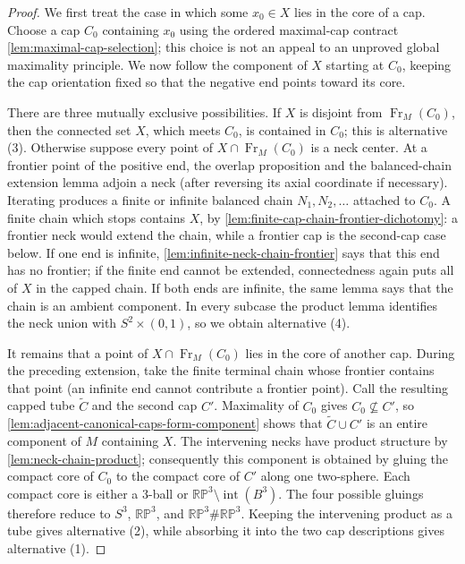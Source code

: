 \begin{proof}
We first treat the case in which some $x_0\in X$ lies in the core of a cap.
Choose a cap $C_0$ containing $x_0$ using the ordered maximal-cap contract
\ref{lem:maximal-cap-selection}; this choice is not an appeal to an
unproved global maximality principle.  We now follow the component
of $X$ starting at $C_0$, keeping the cap orientation fixed so that the
negative end points toward its core.

There are three mutually exclusive possibilities.  If $X$ is disjoint from
$\operatorname{Fr}_M(C_0)$, then the connected set $X$, which meets $C_0$,
is contained in $C_0$; this is alternative (3).  Otherwise suppose every
point of $X\cap\operatorname{Fr}_M(C_0)$ is a neck center.  At a frontier
point of the positive end, the overlap proposition and the balanced-chain
extension lemma adjoin a neck (after reversing its axial coordinate if
necessary).  Iterating produces a finite or infinite balanced chain
  $N_1,N_2,\ldots$ attached to $C_0$.  A finite chain which stops contains
  $X$, by \ref{lem:finite-cap-chain-frontier-dichotomy}: a frontier neck would
  extend the chain, while a frontier cap is the second-cap case below.  If one end
is infinite, \ref{lem:infinite-neck-chain-frontier} says that this end has no
frontier; if the finite end cannot be extended, connectedness again puts all
of $X$ in the capped chain.  If both ends are infinite, the same lemma says
that the chain is an ambient component.  In every subcase the product lemma
identifies the neck union with $S^2\times(0,1)$, so we obtain alternative
(4).

It remains that a point of $X\cap\operatorname{Fr}_M(C_0)$ lies in the core
of another cap.  During the preceding extension, take the finite terminal
chain whose frontier contains that point (an infinite end cannot contribute a
frontier point).  Call the resulting capped tube $\widetilde C$ and the
second cap $C'$.  Maximality of $C_0$ gives $C_0\nsubseteq C'$, so
\ref{lem:adjacent-canonical-caps-form-component} shows that
$\widetilde C\cup C'$ is an entire component of $M$ containing $X$.
The intervening necks have product structure by
\ref{lem:neck-chain-product}; consequently this component is obtained by
gluing the compact core of $C_0$ to the compact core of $C'$ along one
two-sphere.  Each compact core is either a $3$-ball or
$\mathbb{RP}^3\setminus\operatorname{int}(B^3)$.  The four possible
gluings therefore reduce to $S^3$, $\mathbb{RP}^3$, and
$\mathbb{RP}^3\#\mathbb{RP}^3$.  Keeping the intervening product as a tube
gives alternative (2), while absorbing it into the two cap descriptions
gives alternative (1).


\end{proof}
